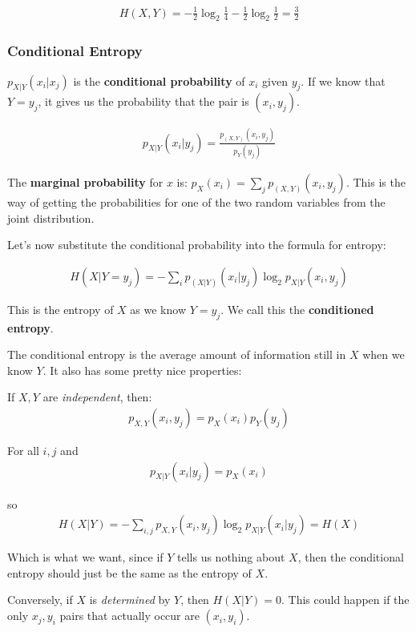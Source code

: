 \documentclass[11pt,a4paper,titlepage,dvipsnames,cmyk]{scrartcl}
\begin{document}
\begin{align*}
H(X,Y) = -\frac{1}{2}\log_2 \frac{1}{4} - \frac{1}{2}\log_2 \frac{1}{2} = \frac{3}{2}
\end{align*}

\subsubsection{Conditional Entropy}
$p_{X|Y}(x_i|x_j)$ is the \textbf{conditional probability} of $x_i$ given $y_j$. If we know that $Y = y_j$, it gives us the probability that the pair is $(x_i, y_j)$.

\begin{align*}
p_{X|Y}(x_i|y_j) = \frac{p_{(X,Y)}(x_i, y_j)}{p_Y(y_j)}
\end{align*}

The \textbf{marginal probability} for $x$ is: $p_X(x_i) = \sum_{j}p_{(X,Y)}(x_i,y_j)$. This is the way of getting the probabilities for one of the two random variables from the joint distribution.

Let's now substitute the conditional probability into the formula for entropy:

\begin{align*}
H(X|Y = y_j) = -\sum_ip_{(X|Y)}(x_i|y_j)\log_2 p_{X|Y}(x_i,y_j)
\end{align*}

This is the entropy of $X$ as we know $Y = y_j$. We call this the \textbf{conditioned entropy}.

The conditional entropy is the average amount of information still in $X$ when we know $Y$. It also has some pretty nice properties:

If $X,Y$ are \textit{independent}, then:
\begin{align*}
    p_{X,Y} (x_i, y_j) = p_X(x_i) p_Y(y_j)
\end{align*} 

For all $i,j$ and
\begin{align*}
p_{X|Y}(x_i|y_j) = p_X(x_i)
\end{align*}

so
\begin{align*}
H(X|Y) = -\sum_{i,j} p_{X,Y}(x_i,y_j) \log_2 p_{X|Y}(x_i|y_j) = H(X)
\end{align*}

Which is what we want, since if $Y$ tells us nothing about $X$, then the conditional entropy should just be the same as the entropy of $X$.

Conversely, if $X$ is \textit{determined} by $Y$, then $H(X|Y) = 0$. This could happen if the only $x_j,y_i$ pairs that actually occur are $(x_i,y_i)$.
\end{document}
